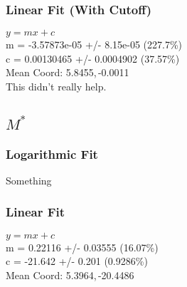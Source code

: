 \documentclass{article}
\begin{document}
		\subsubsection{Linear Fit (With Cutoff)}
			\begin{minipage}[h]{0.6\textwidth}
					\begin{center}
						\begingroup{}
			  			\resizebox{\textwidth}{!}{%
							
			  			}\endgroup
					\end{center}
			\end{minipage}
			\begin{minipage}[h]{0.35\textwidth}
				$y=mx + c$ \\
				m               = -3.57873e-05     +/- 8.15e-05     (227.7\%) \\
				c               = 0.00130465       +/- 0.0004902    (37.57\%) \\

				Mean Coord: 5.8455,\,-0.0011 \\

				This didn't really help.
			\end{minipage}

	\newpage
	\subsection{$M^{*}$}
		\subsubsection{Logarithmic Fit}
			\begin{minipage}[h]{0.6\textwidth}
					\begin{center}
						\begingroup{}
			  			\resizebox{\textwidth}{!}{%
							
			  			}\endgroup
					\end{center}
			\end{minipage}
			\begin{minipage}[h]{0.35\textwidth}
			Something
			\end{minipage}

		\subsubsection{Linear Fit}
			\begin{minipage}[h]{0.6\textwidth}
					\begin{center}
						\begingroup{}
			  			\resizebox{\textwidth}{!}{%
							
			  			}\endgroup
					\end{center}
			\end{minipage}
			\begin{minipage}[h]{0.35\textwidth}
				$y=mx+c$ \\
				m               = 0.22116          +/- 0.03555      (16.07\%) \\
				c               = -21.642          +/- 0.201        (0.9286\%) \\

				Mean Coord: 5.3964,\,-20.4486
			\end{minipage}
\end{document}

